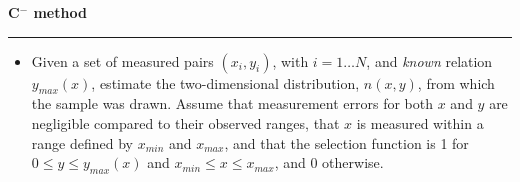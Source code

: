 \documentclass[letterpaper,landscape]{slides}
\begin{document}
\begin{slide}
\begin{center}
\bfseries
{\large {\color{red} C$^-$ method}}
\end{center}
\vskip 0.2in
\hrule

\begin{itemize}
\item
Given a set of measured pairs $(x_i, y_i)$, with 
$i=1 \dots N$, and {\it known} relation $y_{max}(x)$, estimate the two-dimensional
distribution, $n(x,y)$, from which the sample was drawn. Assume that 
measurement errors for both $x$ and $y$ are negligible compared to their observed 
ranges, that $x$ is measured within a range defined by $x_{min}$ and $x_{max}$, 
and that the selection function is 1 for $0 \le y\le y_{max}(x)$ and $x_{min} \le x \le x_{max}$,  
and 0 otherwise.
\end{itemize}

\vskip -0.7in
\phantom{x}

\vfill
\end{slide}
 
\end{document}
